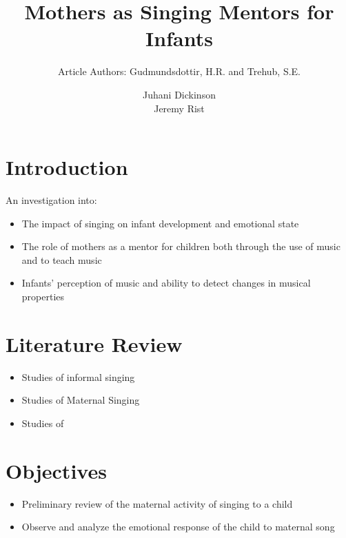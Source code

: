 \documentclass{beamer}
\title{Mothers as Singing Mentors for Infants}
\subtitle{Article Authors: Gudmundsdottir, H.R. and Trehub, S.E.}
\author[Juhani Dickinson, Jeremy Rist]{Juhani Dickinson \\ Jeremy Rist}
\begin{document}
\begin{frame}
	\titlepage
\end{frame}


\section{Introduction}
\begin{frame}
	An investigation into:
	\begin{itemize}
		\item The impact of singing on infant development and emotional state
		\item The role of mothers as a mentor for children both through the use of music and to teach music
		\item Infants' perception of music and ability to detect changes in musical properties
	\end{itemize}
\end{frame}

\section{Literature Review}
\begin{frame}
	\begin{itemize}
		\item Studies of informal singing
		\item Studies of Maternal Singing
		\item Studies of 
	\end{itemize}
\end{frame}

\section{Objectives}
\begin{frame}
	\begin{itemize}
		\item Preliminary review of the maternal activity of singing to a child
		\item Observe and analyze the emotional response of the child to maternal song
	\end{itemize}
\end{frame}
\end{document}
